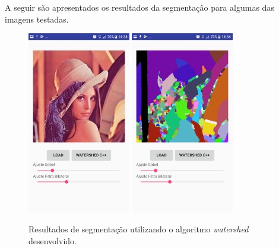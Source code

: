 A seguir são apresentados os resultados da segmentação para algumas das imagens testadas.
\begin{figure}[!htb]
 \centering
 \def\baselinestretch{1}\small\normalsize
 \includegraphics[width=0.4\textwidth]{img/imagem_watershed_desenvolvido_app_n1.png}\qquad
 \includegraphics[width=0.4\textwidth]{img/resultado_watershed_desenvolvido_app_n1.png} 
 \caption{\label{fig:resultado_watershed_desenvolvido_app_p1}Resultados de segmentação utilizando o algoritmo \textit{watershed} desenvolvido.}
\end{figure}

